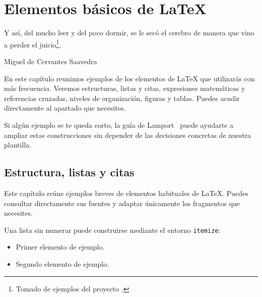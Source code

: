 %

\chapter{Elementos básicos de \LaTeX{}}
\label{cha:elementos-basicos}

\begin{FraseCelebre}
  \begin{Frase}
    Y así, del mucho leer y del poco dormir, se le secó el cerebro de manera que vino a perder el juicio\footnote{Tomado de ejemplos del proyecto \texis{}.}.
  \end{Frase}
  \begin{Fuente}
    Miguel de Cervantes Saavedra
  \end{Fuente}
\end{FraseCelebre}

En este capítulo reunimos ejemplos de los elementos de \LaTeX{} que utilizarás con más frecuencia. Veremos estructuras, listas y citas, expresiones matemáticas y referencias cruzadas, niveles de organización, figuras y tablas. Puedes acudir directamente al apartado que necesites.

Si algún ejemplo se te queda corto, la guía de Lamport~\cite{lamport94} puede ayudarte a ampliar estas construcciones sin depender de las decisiones concretas de nuestra plantilla.

\section{Estructura, listas y citas}
\label{sec:estructura-listas-citas}

Este capítulo reúne ejemplos breves de elementos habituales de \LaTeX{}. Puedes consultar directamente sus fuentes y adaptar únicamente los fragmentos que necesites.

Una lista sin numerar puede construirse mediante el entorno \texttt{itemize}:

\begin{itemize}
  \item Primer elemento de ejemplo.
  \item Segundo elemento de ejemplo.
\end{itemize}

